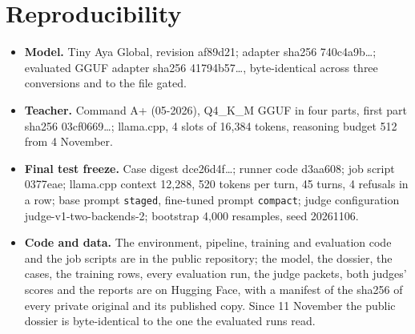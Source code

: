\documentclass[11pt]{article}
\begin{document}
\tableofcontents
\newpage












\appendix
\section{Reproducibility}\label{app:repro}
\begin{itemize}
  \item \textbf{Model.} Tiny Aya Global, revision af89d21; adapter sha256 740c4a9b\ldots; evaluated GGUF adapter sha256
        41794b57\ldots, byte-identical across three conversions and to the file gated.
  \item \textbf{Teacher.} Command A+ (05-2026), Q4\_K\_M GGUF in four parts, first part sha256 03cf0669\ldots; llama.cpp,
        4 slots of 16{,}384 tokens, reasoning budget 512 from 4 November.
  \item \textbf{Final test freeze.} Case digest dce26d4f\ldots; runner code d3aa608; job script 0377eae; llama.cpp
        context 12{,}288, 520 tokens per turn, 45 turns, 4 refusals in a row; base prompt \texttt{staged}, fine-tuned
        prompt \texttt{compact}; judge configuration judge-v1-two-backends-2; bootstrap 4{,}000 resamples, seed 20261106.
  \item \textbf{Code and data.} The environment, pipeline, training and evaluation code and the job scripts are in the
        public repository; the model, the dossier, the cases, the training rows, every evaluation run, the
        judge packets, both judges' scores and the reports are on Hugging Face, with a manifest of the sha256 of every
        private original and its published copy. Since 11 November the public dossier is byte-identical to the one the
        evaluated runs read.
\end{itemize}
\end{document}

